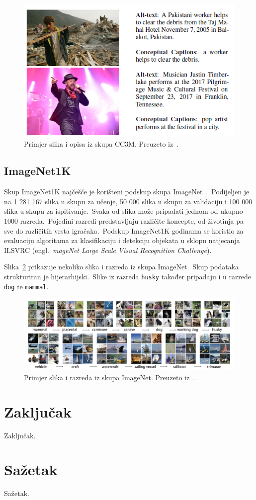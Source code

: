 \documentclass[times, utf8, seminar, numeric]{fer}
\begin{document}
\begin{figure}[h]
    \centering
    \includegraphics[scale=0.7]{./Slike/CC3M.png}
    \caption{Primjer slika i opisa iz skupa CC3M. Preuzeto iz~\cite{sharma2018conceptual}.}
    \label{fig:CC3M}
\end{figure}

\section{ImageNet1K}

Skup ImageNet1K najčešće je korišteni podskup skupa ImageNet~\cite{deng2009imagenet}.\ 
Podijeljen je na 1 281 167 slika u skupu za učenje, 50 000 slika u skupu za validaciju i 100 000 slika u skupu za ispitivanje.\ 
Svaka od slika može pripadati jednom od ukupno 1000 razreda.\ Pojedini razredi predstavljaju različite koncepte, od životinja pa sve do različitih vrsta igračaka.\ 
Podskup ImageNet1K godinama se koristio za evaluaciju algoritama za klasifikaciju i detekciju objekata u sklopu natjecanja ILSVRC (engl.\ \textit{mageNet Large Scale Visual Recognition Challenge}).\
  
Slika~\ref{fig:imagenet} prikazuje nekoliko slika i razreda iz skupa ImageNet.\ Skup podataka strukturiran je hijerarhijski.\ Slike iz razreda \texttt{husky} također pripadaju i u razrede \texttt{dog} te \texttt{mammal}.\

\begin{figure}[h]
    \centering
    \includegraphics[scale=0.33]{./Slike/imagenet.png}
    \caption{Primjer slika i razreda iz skupa ImageNet. Preuzeto iz~\cite{deng2009imagenet}.}
    \label{fig:imagenet}
\end{figure}

\chapter{Zaključak}
Zaključak.




\chapter{Sažetak}
Sažetak.
\end{document}
